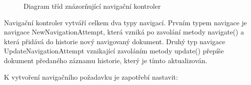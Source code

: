 \begin{figure}[H]
  \begin{center}
    \caption{Diagram tříd znázorňující navigační kontroler}
    \label{Figure.NavigationController}
  \end{center}
\end{figure}

Navigační kontroler vytváří celkem dva typy navigací. Prvním typem navigace je navigace NewNavigationAttempt, která vzniká po zavolání metody navigate() a která přidává do historie nový navigovaný dokument. Druhý typ navigace UpdateNavigationAttempt vznikající zavoláním metody update() přepíše dokument předaného záznamu historie, který je tímto aktualizován.

\noindent K vytvoření navigačního požadavku je zapotřebí nastavit:  

